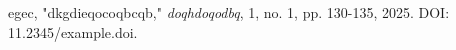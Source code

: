 \documentclass[11pt]{article}
\begin{document}
\noindent
egec, "dkgdieqocoqbcqb," \textit{doqhdoqodbq}, 1, no. 1, pp. 130-135, 2025. DOI: 11.2345/example.doi.
\end{document}
